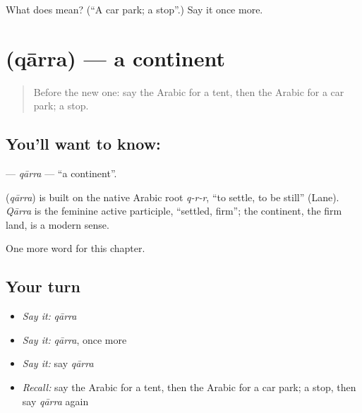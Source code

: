 \begin{tcolorbox}[breakable,colback=teal!4,colframe=teal!35!black,title={Before you move on}]
What does  mean? (\textquotedblleft{}A car park; a stop\textquotedblright{}.) Say it once more.
\end{tcolorbox}
\section[\texorpdfstring{\ar{قارة} (qārra)}{قارة (qārra)}]{ (qārra) — a continent}

\label{lesson:AR-C173-qarra}



\begin{quote}
Before the new one: say the Arabic for a tent, then the Arabic for a car park; a stop.
\end{quote}

\subsection*{You'll want to know: }
\textbf{} — \emph{qārra} — \textquotedblleft{}a continent\textquotedblright{}.

\begin{cousinweb}
\textbf{} (\emph{qārra}) is built on the native Arabic root \emph{q-r-r}, \textquotedblleft{}to settle, to be still\textquotedblright{} (Lane). \emph{Qārra} is the feminine active participle, \textquotedblleft{}settled, firm\textquotedblright{}; the continent, the firm land, is a modern sense.
\end{cousinweb}

\begin{grammarlens}[title={What you've built}]
One more word for this chapter.
\end{grammarlens}

\subsection*{Your turn}
\begin{itemize}
\raggedright
  \item \emph{Say it:} \emph{qārra}
  \item \emph{Say it:} \emph{qārra}, once more
  \item \emph{Say it:} say \emph{qārra}
  \item \emph{Recall:} say the Arabic for a tent, then the Arabic for a car park; a stop, then say \emph{qārra} again
\end{itemize}

